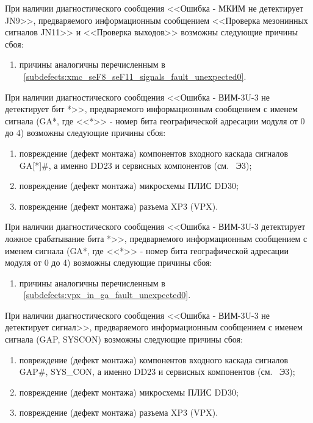     \subpoint При наличии диагностического сообщения <<Ошибка - МКИМ не детектирует JN9>>,
	      предваряемого информационным сообщением <<Проверка мезонинных сигналов JN11>> и <<Проверка выходов>> возможны следующие причины сбоя:
      \begin{enumerate}
	\item причины аналогичны перечисленным в ~\ref{subdefects:xmc_seF8_seF11_signals_fault_unexpected0}.
      \end{enumerate}
  
      
  \begin{sloppypar}
    \subpoint При наличии диагностического сообщения <<Ошибка - ВИМ-3U-3 не детектирует бит *>>, 
	      предваряемого информационным сообщением с именем сигнала (GA*, где <<*>> - номер бита географической адресации модуля от 0 до 4) возможны следующие причины сбоя:
      \label{subdefects:vpx_in_ga_fault_unexpected0}
      \begin{enumerate}
	\item повреждение (дефект монтажа) компонентов входного каскада сигналов GA[*]\#, а именно DD23 и сервисных компонентов (см. \DocProductSignature~Э3);
	\item повреждение (дефект монтажа) микросхемы ПЛИС DD30;
	\item повреждение (дефект монтажа) разъема XP3 (VPX).
      \end{enumerate}
      
    \subpoint При наличии диагностического сообщения <<Ошибка - ВИМ-3U-3 детектирует ложное срабатывание бита *>>, 
	      предваряемого информационным сообщением с именем сигнала (GA*, где <<*>> - номер бита географической адресации модуля от 0 до 4) возможны следующие причины сбоя:
      \begin{enumerate}
	\item причины аналогичны перечисленным в ~\ref{subdefects:vpx_in_ga_fault_unexpected0}.
      \end{enumerate}
    
    \subpoint При наличии диагностического сообщения <<Ошибка - ВИМ-3U-3 не детектирует сигнал>>,
	      предваряемого информационным сообщением с именем сигнала (GAP, SYSCON) возможны следующие причины сбоя:
      \label{subdefects:vpx_in_gap_syscon_fault_unexpected0}
      \begin{enumerate}
	\item повреждение (дефект монтажа) компонентов входного каскада сигналов GAP\#, SYS\_CON, а именно DD23 и сервисных компонентов (см. \DocProductSignature~Э3);
	\item повреждение (дефект монтажа) микросхемы ПЛИС DD30;
	\item повреждение (дефект монтажа) разъема XP3 (VPX).
      \end{enumerate}
      

\end{sloppypar}
